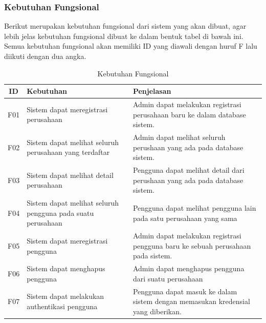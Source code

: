 \subsubsection{Kebutuhan Fungsional}
Berikut merupakan kebutuhan fungsional dari sistem yang akan dibuat, agar lebih jelas kebutuhan fungsional dibuat ke dalam bentuk tabel di bawah ini. Semua kebutuhan fungsional akan memiliki ID yang diawali dengan huruf F lalu diikuti dengan dua angka.

\begin{table}
  \caption{Kebutuhan Fungsional}
  \label{tab:kebutuhan-fungsional}
  \centering
  \begin{tabular}{|c|p{4.5cm}|p{8cm}|}
    \hline
    ID  & Kebutuhan                                                                      & Penjelasan                                                                                                 \\
    \hline
    F01 & Sistem dapat meregistrasi perusahaan                                           & Admin dapat melakukan registrasi perusahaan baru ke dalam database sistem.                                 \\
    \hline
    F02 & Sistem dapat melihat seluruh perusahaan yang terdaftar                         & Admin dapat melihat seluruh perushaan yang ada pada database sistem.                                       \\
    \hline
    F03 & Sistem dapat melihat detail perusahaan                                         & Pengguna dapat melihat detail dari perushaan yang ada pada database sistem.                                \\
    \hline
    F04 & Sistem dapat melihat seluruh pengguna pada suatu perusahaan                    & Pengguna dapat melihat pengguna lain pada satu perusahaan yang sama                                        \\
    \hline
    F05 & Sistem dapat meregistrasi pengguna                                             & Admin dapat melakukan registrasi pengguna baru ke sebuah perusahaan pada sistem.                           \\
    \hline
    F06 & Sistem dapat menghapus pengguna                                                & Admin dapat menghapus pengguna dari suatu perusahaan                                                       \\
    \hline
    F07 & Sistem dapat melakukan authentikasi pengguna                                   & Pengguna dapat masuk ke dalam sistem dengan memasukan kredensial yang diberikan.                           \\

\end{tabular}
\end{table}
